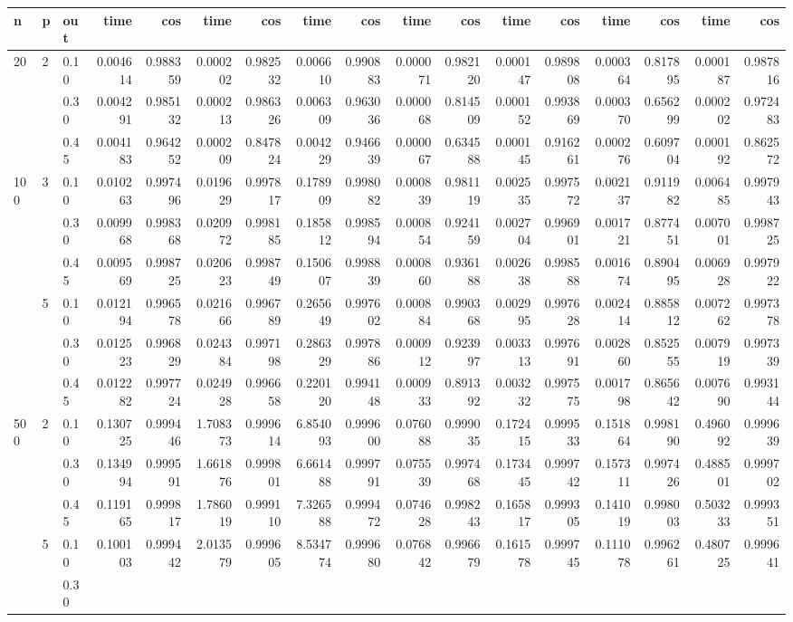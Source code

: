 \begin{table}[h!]
{\begin{adjustwidth}{-3cm}{0cm}
{\begin{tabular}{l|l|l|r|r|r|r|r|r|r|r|r|r|r|r|r|r|}
         n  & p  & out &      time &       cos &      time &       cos &      time &       cos &      time &       cos &      time &       cos &      time &       cos &      time &       cos \\
         \hline
        20  & 2 & 0.10 &  0.004614 &  0.988359 &  0.000202 &  0.982532 &  0.006610 &  0.990883 &  0.000071 &  0.982120 &  0.000147 &  0.989808 &  0.000364 &  0.817895 &  0.000187 &  0.987816 \\    &   & 0.30 &  0.004291 &  0.985132 &  0.000213 &  0.986326 &  0.006309 &  0.963036 &  0.000068 &  0.814509 &  0.000152 &  0.993869 &  0.000370 &  0.656299 &  0.000202 &  0.972483 \\    &   & 0.45 &  0.004183 &  0.964252 &  0.000209 &  0.847824 &  0.004229 &  0.946639 &  0.000067 &  0.634588 &  0.000145 &  0.916261 &  0.000276 &  0.609704 &  0.000192 &  0.862572 \\100 & 3 & 0.10 &  0.010263 &  0.997496 &  0.019629 &  0.997817 &  0.178909 &  0.998082 &  0.000839 &  0.981119 &  0.002535 &  0.997572 &  0.002137 &  0.911982 &  0.006485 &  0.997943 \\    &   & 0.30 &  0.009968 &  0.998368 &  0.020972 &  0.998185 &  0.185812 &  0.998594 &  0.000854 &  0.924159 &  0.002704 &  0.996901 &  0.001721 &  0.877451 &  0.007001 &  0.998725 \\    &   & 0.45 &  0.009569 &  0.998725 &  0.020623 &  0.998749 &  0.150607 &  0.998839 &  0.000860 &  0.936188 &  0.002638 &  0.998588 &  0.001674 &  0.890495 &  0.006928 &  0.997922 \\    & 5 & 0.10 &  0.012194 &  0.996578 &  0.021666 &  0.996789 &  0.265649 &  0.997602 &  0.000884 &  0.990368 &  0.002995 &  0.997628 &  0.002414 &  0.885812 &  0.007262 &  0.997378 \\    &   & 0.30 &  0.012523 &  0.996829 &  0.024384 &  0.997198 &  0.286329 &  0.997886 &  0.000912 &  0.923997 &  0.003313 &  0.997691 &  0.002860 &  0.852555 &  0.007919 &  0.997339 \\    &   & 0.45 &  0.012282 &  0.997724 &  0.024928 &  0.996658 &  0.220120 &  0.994148 &  0.000933 &  0.891392 &  0.003232 &  0.997575 &  0.001798 &  0.865642 &  0.007690 &  0.993144 \\500 & 2 & 0.10 &  0.130725 &  0.999446 &  1.708373 &  0.999614 &  6.854093 &  0.999600 &  0.076088 &  0.999035 &  0.172415 &  0.999533 &  0.151864 &  0.998190 &  0.496092 &  0.999639 \\    &   & 0.30 &  0.134994 &  0.999591 &  1.661876 &  0.999801 &  6.661488 &  0.999791 &  0.075539 &  0.997468 &  0.173445 &  0.999742 &  0.157311 &  0.997426 &  0.488501 &  0.999702 \\    &   & 0.45 &  0.119165 &  0.999817 &  1.786019 &  0.999110 &  7.326588 &  0.999472 &  0.074628 &  0.998243 &  0.165817 &  0.999305 &  0.141019 &  0.998003 &  0.503233 &  0.999351 \\    & 5 & 0.10 &  0.100103 &  0.999442 &  2.013579 &  0.999605 &  8.534774 &  0.999680 &  0.076842 &  0.996679 &  0.161578 &  0.999745 &  0.111078 &  0.996261 &  0.480725 &  0.999641 \\    &   & 0.30 &  
\end{tabular}}
\end{adjustwidth}}
\end{table}

